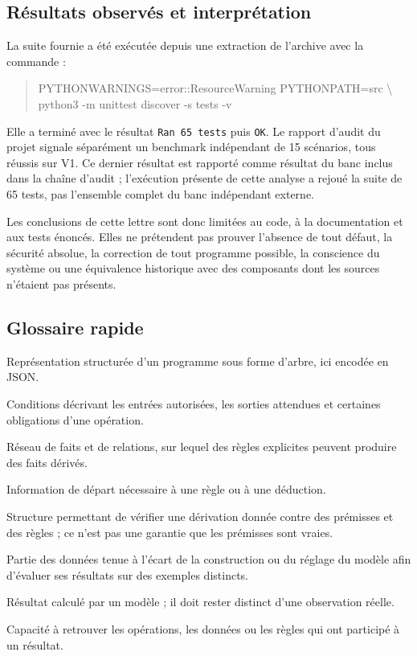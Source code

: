 \documentclass[11pt,a4paper]{article}
\newcommand{\code}[1]{\texttt{\small #1}}
\begin{document}
\subsection*{Résultats observés et interprétation}

La suite fournie a été exécutée depuis une extraction de l'archive avec la commande :
\begin{quote}\small\ttfamily
PYTHONWARNINGS=error::ResourceWarning PYTHONPATH=src \textbackslash{}\\
python3 -m unittest discover -s tests -v
\end{quote}
Elle a terminé avec le résultat \code{Ran 65 tests} puis \code{OK}. Le rapport d'audit du projet signale séparément un benchmark indépendant de 15 scénarios, tous réussis sur V1. Ce dernier résultat est rapporté comme résultat du banc inclus dans la chaîne d'audit ; l'exécution présente de cette analyse a rejoué la suite de 65 tests, pas l'ensemble complet du banc indépendant externe.

Les conclusions de cette lettre sont donc limitées au code, à la documentation et aux tests énoncés. Elles ne prétendent pas prouver l'absence de tout défaut, la sécurité absolue, la correction de tout programme possible, la conscience du système ou une équivalence historique avec des composants dont les sources n'étaient pas présents.

\subsection*{Glossaire rapide}

\begin{description}[leftmargin=2.7cm,style=nextline]
  \item[AST] Représentation structurée d'un programme sous forme d'arbre, ici encodée en JSON.
  \item[Contrat] Conditions décrivant les entrées autorisées, les sorties attendues et certaines obligations d'une opération.
  \item[Maillage] Réseau de faits et de relations, sur lequel des règles explicites peuvent produire des faits dérivés.
  \item[Prémisse] Information de départ nécessaire à une règle ou à une déduction.
  \item[Certificat] Structure permettant de vérifier une dérivation donnée contre des prémisses et des règles ; ce n'est pas une garantie que les prémisses sont vraies.
  \item[Holdout] Partie des données tenue à l'écart de la construction ou du réglage du modèle afin d'évaluer ses résultats sur des exemples distincts.
  \item[Simulation] Résultat calculé par un modèle ; il doit rester distinct d'une observation réelle.
  \item[Traçabilité] Capacité à retrouver les opérations, les données ou les règles qui ont participé à un résultat.
\end{description}
\end{document}
